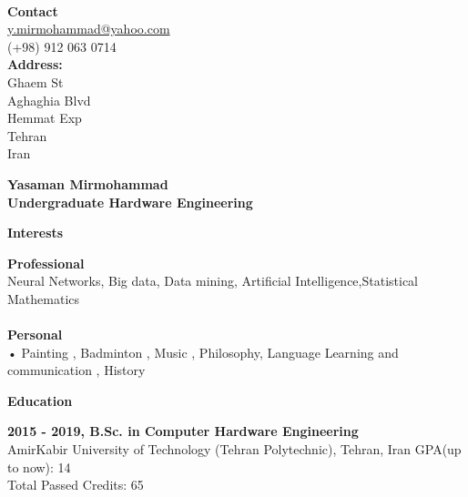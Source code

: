 \documentclass[a4paper,12pt,final]{memoir}
\newcommand{\Sep}{\vspace{1.5em}}
\newcommand{\SmallSep}{\vspace{0.5em}}
\newenvironment{AboutMe}
	{\ignorespaces\textbf{\color{RoyalBlue} About me}}
	{\Sep\ignorespacesafterend}
\newcommand{\CVSection}[1]
	{\Large\textbf{#1}\par
	\SmallSep\normalsize\normalfont}
\newcommand{\CVItem}[1]
	{\textbf{\color{RoyalBlue} #1}}
\begin{document}


\begin{flushright}\small

	
	 \CVItem{\\ Contact} \\
	 
	\url{y.mirmohammad@yahoo.com}  \\
  (+98) 912 063 0714  \\

	\CVItem{Address:} \\
	Ghaem St \\
	Aghaghia Blvd \\
	Hemmat Exp  \\
	Tehran\\
	Iran 
	
\end{flushright}\normalsize
\framebreak


\Huge\bfseries {\color{RoyalBlue} Yasaman Mirmohammad} \\
\Large\bfseries  Undergraduate Hardware Engineering \\

\normalsize\normalfont


\CVSection{Interests}
	\CVItem{Professional}
	\\
 Neural Networks, Big data, Data mining, Artificial Intelligence,Statistical Mathematics \\
	   
	\\
	\CVItem{Personal}
	\\
	•	Painting , Badminton , Music ,  Philosophy, Language Learning and communication , History 
	
\Sep

\CVSection{Education}
\CVItem{2015 - 2019, B.Sc. in Computer Hardware Engineering}\\
AmirKabir University of Technology (Tehran Polytechnic), Tehran, Iran
GPA(up to now): 14 \\
Total Passed Credits: 65
\SmallSep
\end{document}
